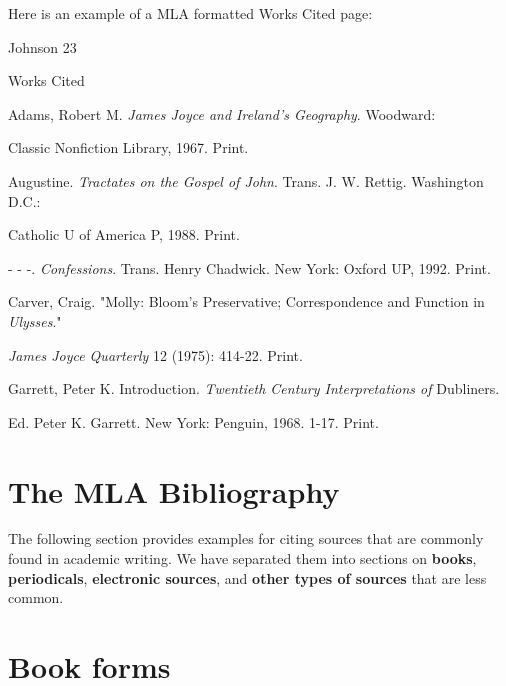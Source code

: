 Here is an example of a MLA formatted Works Cited page:

\newpage
\thispagestyle{empty}
\begin{flushright}Johnson 23\end{flushright}
\begin{center}
Works Cited
\end{center}
\begin{Spacing}{2}
Adams, Robert M. \emph{James Joyce and Ireland's Geography}. Woodward: 

\hspace{.4in}Classic Nonfiction Library, 1967. Print.

Augustine. \emph{Tractates on the Gospel of John}. Trans. J. W. Rettig. Washington D.C.:

\hspace{.4in}Catholic U of America P, 1988. Print.

- - -. \emph{Confessions}. Trans. Henry Chadwick. New York: Oxford UP, 1992. Print.

Carver, Craig. "Molly: Bloom's Preservative; Correspondence and Function in \emph{Ulysses}."

\hspace{.4in}\emph{James Joyce Quarterly} 12 (1975): 414-22. Print.

Garrett, Peter K. Introduction. \emph{Twentieth Century Interpretations of} Dubliners.

\hspace{.4in}Ed. Peter K. Garrett. New York: Penguin, 1968. 1-17. Print.

\end{Spacing}

\newpage




										                

\section{The MLA Bibliography}

The following section provides examples for citing sources that are commonly found in
academic writing. We have separated them into sections on \textbf{books}, \textbf{periodicals}, \textbf{electronic
sources}, and \textbf{other types of sources} that are less common.


\section{Book forms}

